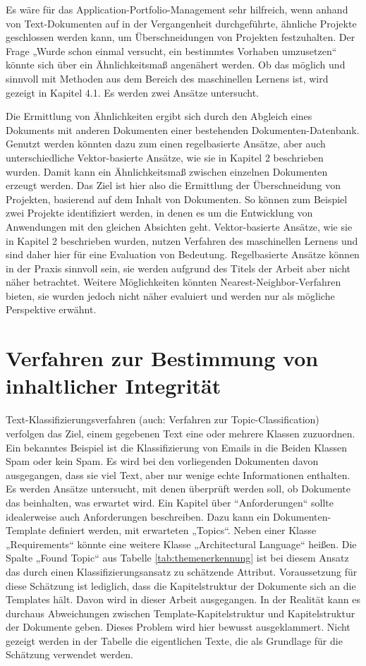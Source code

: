 Es wäre für das Application-Portfolio-Management sehr hilfreich, wenn anhand von Text-Dokumenten auf in der Vergangenheit durchgeführte, ähnliche Projekte geschlossen werden kann, um Überschneidungen von Projekten festzuhalten. Der Frage „Wurde schon einmal versucht, ein bestimmtes Vorhaben umzusetzen“ könnte sich über ein Ähnlichkeitsmaß angenähert werden. Ob das möglich und sinnvoll mit Methoden aus dem Bereich des maschinellen Lernens ist, wird gezeigt in Kapitel 4.1. Es werden zwei Ansätze untersucht.

Die Ermittlung von Ähnlichkeiten ergibt sich durch den Abgleich eines Dokuments mit anderen Dokumenten einer bestehenden Dokumenten-Datenbank. Genutzt werden könnten dazu zum einen regelbasierte Ansätze, aber auch unterschiedliche Vektor-basierte Ansätze, wie sie in Kapitel 2 beschrieben wurden. Damit kann ein Ähnlichkeitsmaß zwischen einzelnen Dokumenten erzeugt werden. Das Ziel ist hier also die Ermittlung der Überschneidung von Projekten, basierend auf dem Inhalt von Dokumenten. So können zum Beispiel zwei Projekte identifiziert werden, in denen es um die Entwicklung von Anwendungen mit den gleichen Absichten geht. Vektor-basierte Ansätze, wie sie in Kapitel 2 beschrieben wurden, nutzen Verfahren des maschinellen Lernens und sind daher hier für eine Evaluation von Bedeutung. Regelbasierte Ansätze können in der Praxis sinnvoll sein, sie werden aufgrund des Titels der Arbeit aber nicht näher betrachtet. Weitere Möglichkeiten könnten Nearest-Neighbor-Verfahren bieten, sie wurden jedoch nicht näher evaluiert und werden nur als mögliche Perspektive erwähnt.

\section{Verfahren zur Bestimmung von inhaltlicher Integrität}

Text-Klassifizierungsverfahren (auch: Verfahren zur Topic-Classification) verfolgen das Ziel, einem gegebenen Text eine oder mehrere Klassen zuzuordnen. Ein bekanntes Beispiel ist die Klassifizierung von Emails in die Beiden Klassen Spam oder kein Spam. \cite{Gupta} Es wird bei den vorliegenden Dokumenten davon ausgegangen, dass sie viel Text, aber nur wenige echte Informationen enthalten. 
Es werden Ansätze untersucht, mit denen überprüft werden soll, ob Dokumente das beinhalten, was erwartet wird. Ein Kapitel über ``Anforderungen`` sollte idealerweise auch Anforderungen beschreiben.
Dazu kann ein Dokumenten-Template definiert werden, mit erwarteten „Topics“. Neben einer Klasse „Requirements“ könnte eine weitere Klasse „Architectural Language“ heißen. Die Spalte „Found Topic“ aus Tabelle \ref{tab:themenerkennung} ist bei diesem Ansatz das durch einen Klassifizierungsansatz zu schätzende Attribut. Voraussetzung für diese Schätzung ist lediglich, dass die Kapitelstruktur der Dokumente sich an die Templates hält. Davon wird in dieser Arbeit ausgegangen. In der Realität kann es durchaus Abweichungen zwischen Template-Kapitelstruktur und Kapitelstruktur der Dokumente geben. Dieses Problem wird hier bewusst ausgeklammert. Nicht gezeigt werden in der Tabelle die eigentlichen Texte, die als Grundlage für die Schätzung verwendet werden. 


